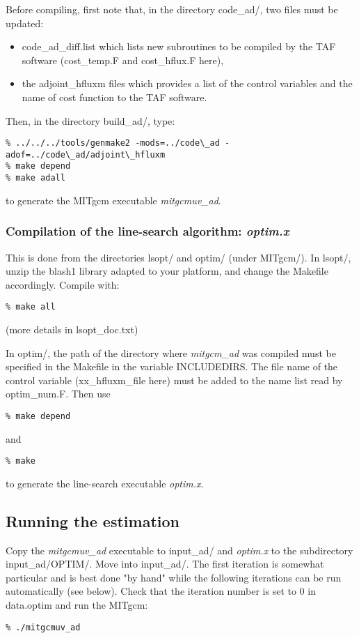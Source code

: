 Before compiling, first note that, in the directory code\_ad/, two files
must be updated:
\begin{itemize}
\item code\_ad\_diff.list which lists new subroutines to be compiled
by the TAF software (cost\_temp.F and cost\_hflux.F here),

\item  the adjoint\_hfluxm files which provides a list of the control variables
and the name of cost function to the TAF software.

\end{itemize}

Then, in the directory build\_ad/, type:
\begin{verbatim}
% ../../../tools/genmake2 -mods=../code\_ad -adof=../code\_ad/adjoint\_hfluxm
% make depend
% make adall
\end{verbatim}
to generate the MITgcm executable {\it mitgcmuv\_ad}.

\subsubsection{Compilation of the line-search algorithm: {\it optim.x}}

This is done from the directories lsopt/ and optim/ (under MITgcm/). In lsopt/,
unzip the blash1 library adapted to your platform, and change the Makefile
accordingly. Compile with:
\begin{verbatim}
% make all
\end{verbatim}
(more details in lsopt\_doc.txt)

In optim/,  the path of the directory where {\it mitgcm\_ad} was compiled
must be specified in the Makefile in the variable INCLUDEDIRS. The file name
of the control variable (xx\_hfluxm\_file here) must be added to the name list
read by optim\_num.F. Then use
\begin{verbatim}
% make depend
\end{verbatim} 
and
\begin{verbatim}
% make
\end{verbatim}
to generate the line-search executable {\it optim.x}.

\subsection{Running the estimation}

Copy the {\it mitgcmuv\_ad} executable to input\_ad/ and {\it optim.x} to the
subdirectory input\_ad/OPTIM/. Move into input\_ad/. The first iteration is
somewhat particular and is best done "by hand" while the following iterations
can be run automatically (see below). Check that the iteration number is set
to 0 in data.optim and run the MITgcm:
\begin{verbatim}
% ./mitgcmuv_ad
\end{verbatim}


